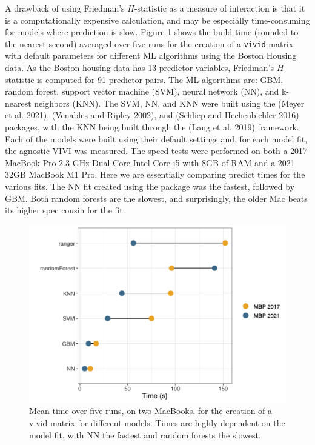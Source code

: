 A drawback of using Friedman's \(H\)-statistic as a measure of interaction is that it is a computationally expensive calculation, and may be especially time-consuming for models where prediction is slow.
Figure \ref{fig:speedtest}
shows the build time (rounded to the nearest second) averaged over five runs for the creation of a \texttt{vivid} matrix with default parameters for different ML algorithms using the Boston Housing data. As the Boston housing data has 13 predictor variables, Friedman's \(H\)-statistic is computed for 91 predictor pairs. The ML algorithms are: GBM, random forest, support vector machine (SVM), neural network (NN), and k-nearest neighbors (KNN). The SVM, NN, and KNN were built using the  (Meyer et al. 2021),  (Venables and Ripley 2002), and  (Schliep and Hechenbichler 2016) packages, with the KNN being built through the  (Lang et al. 2019) framework. Each of the models were built using their default settings and, for each model fit, the agnostic VIVI was measured. The speed tests were performed on both a 2017 MacBook Pro 2.3 GHz Dual-Core Intel Core i5 with 8GB of RAM and a 2021 32GB MacBook M1 Pro. Here we are essentially comparing predict times for the various fits. The NN fit created using the  package was the fastest, followed by GBM. Both random forests are the slowest, and surprisingly, the older Mac beats its higher spec cousin for the  fit.

\begin{figure}

{\centering \includegraphics[width=0.6\linewidth]{speedTestsplot} 

}

\caption{Mean time over five runs, on two MacBooks, for the creation of a vivid matrix for different models. Times are highly dependent on the model fit, with NN the fastest and random forests the slowest.}\label{fig:speedtest}
\end{figure}

